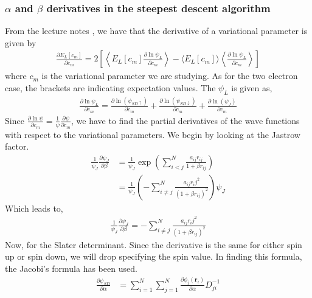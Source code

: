 \documentclass[11pt]{article}
\begin{document}
\subsubsection{\texorpdfstring{$\alpha$}{a} and \texorpdfstring{$\beta$}{b} derivatives in the steepest descent algorithm}
From the lecture notes \cite{komp2015}, we have that the derivative of a variational parameter is given by
\begin{align*}
	\frac{\partial E_L[c_m]}{\partial c_m} = 2 \left[ \left\langle E_L[c_m] \frac{\partial \ln \psi_L}{\partial c_m} \right\rangle - \langle E_L[c_m] \rangle \left\langle \frac{\partial \ln \psi_L}{\partial c_m} \right\rangle
	\right]
\end{align*}
where $c_m$ is the variational parameter we are studying. As for the two electron case, the brackets are indicating expectation values. The $\psi_L$ is given as,
\begin{align}
	\frac{\partial\ln \psi_L}{\partial c_m} = \frac{\partial\ln (\psi_{SD\uparrow})}{\partial c_m} + \frac{\partial\ln (\psi_{SD\downarrow})}{\partial c_m} + \frac{\partial\ln (\psi_{J})}{\partial c_m}
\end{align}
Since $\frac{\partial\ln\psi}{\partial c_m} = \frac{1}{\psi}\frac{\partial \psi}{\partial c_m}$, we have to find the partial derivatives of the wave functions with respect to the variational parameters. We begin by looking at the Jastrow factor.
\begin{align*}
	\frac{1}{\psi_J}\frac{\partial\psi_J}{\partial \beta} &= \frac{1}{\psi_J} \exp\left(\sum^N_{i<j}\frac{a_{ij}r_{ij}}{1+\beta r_{ij}}\right) \\
	&= \frac{1}{\psi_J}\left( - \sum_{i\neq j}^N \frac{a_{ij}r_ij^2}{(1+\beta r_{ij})^2} \right) \psi_J
\end{align*}
Which leads to,
\begin{align}
	\frac{1}{\psi_J}\frac{\partial\psi_J}{\partial \beta} = - \sum_{i\neq j}^N \frac{a_{ij}r_ij^2}{(1+\beta r_{ij})^2}
	\label{eq:jastrow-beta-derivative-n-particle}
\end{align}
Now, for the Slater determinant. Since the derivative is the same for either spin up or spin down, we will drop specifying the spin value. In finding this formula, the Jacobi's formula has been used.
\begin{align}
	\frac{\partial \psi_{SD}}{\partial\alpha} &= \sum^N_{i=1}\sum^N_{j=1} \frac{\partial\phi_j(\mathbf{r}_i)}{\partial \alpha} D^{-1}_{ji} \\
	\label{eq:slater-determinant-alpha-derivative}
\end{align}
\end{document}
